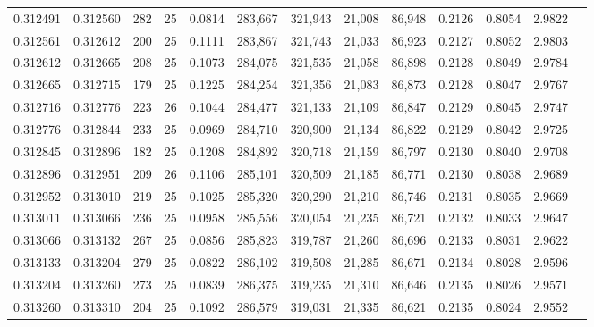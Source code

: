 \begin{tabular}{rrrrrrrrrrrrr}
0.312491 & 0.312560 &   282 &  25 &                                     0.0814 & 283,667 & 321,943 &  21,008 &  86,948 & 0.2126 & 0.8054 & 2.9822 \\
0.312561 & 0.312612 &   200 &  25 &                                     0.1111 & 283,867 & 321,743 &  21,033 &  86,923 & 0.2127 & 0.8052 & 2.9803 \\
0.312612 & 0.312665 &   208 &  25 &                                     0.1073 & 284,075 & 321,535 &  21,058 &  86,898 & 0.2128 & 0.8049 & 2.9784 \\
0.312665 & 0.312715 &   179 &  25 &                                     0.1225 & 284,254 & 321,356 &  21,083 &  86,873 & 0.2128 & 0.8047 & 2.9767 \\
0.312716 & 0.312776 &   223 &  26 &                                     0.1044 & 284,477 & 321,133 &  21,109 &  86,847 & 0.2129 & 0.8045 & 2.9747 \\
0.312776 & 0.312844 &   233 &  25 &                                     0.0969 & 284,710 & 320,900 &  21,134 &  86,822 & 0.2129 & 0.8042 & 2.9725 \\
0.312845 & 0.312896 &   182 &  25 &                                     0.1208 & 284,892 & 320,718 &  21,159 &  86,797 & 0.2130 & 0.8040 & 2.9708 \\
0.312896 & 0.312951 &   209 &  26 &                                     0.1106 & 285,101 & 320,509 &  21,185 &  86,771 & 0.2130 & 0.8038 & 2.9689 \\
0.312952 & 0.313010 &   219 &  25 &                                     0.1025 & 285,320 & 320,290 &  21,210 &  86,746 & 0.2131 & 0.8035 & 2.9669 \\
0.313011 & 0.313066 &   236 &  25 &                                     0.0958 & 285,556 & 320,054 &  21,235 &  86,721 & 0.2132 & 0.8033 & 2.9647 \\
0.313066 & 0.313132 &   267 &  25 &                                     0.0856 & 285,823 & 319,787 &  21,260 &  86,696 & 0.2133 & 0.8031 & 2.9622 \\
0.313133 & 0.313204 &   279 &  25 &                                     0.0822 & 286,102 & 319,508 &  21,285 &  86,671 & 0.2134 & 0.8028 & 2.9596 \\
0.313204 & 0.313260 &   273 &  25 &                                     0.0839 & 286,375 & 319,235 &  21,310 &  86,646 & 0.2135 & 0.8026 & 2.9571 \\
0.313260 & 0.313310 &   204 &  25 &                                     0.1092 & 286,579 & 319,031 &  21,335 &  86,621 & 0.2135 & 0.8024 & 2.9552 \\

\end{tabular}
